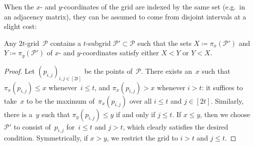 \documentclass[a4paper,UKenglish,cleveref,thm-restate]{lipics-v2021}
\theoremstyle{remark}
\newcommand{\eqdef}{\coloneqq}
\newcommand{\Pc}{\mathcal{P}}
\newcommand{\Xco}{\pi_x}
\newcommand{\Yco}{\pi_y}
\begin{document}
When the $x$- and $y$-coordinates of the grid are indexed by the same set (e.g.\ in an adjacency matrix),
they can be assumed to come from disjoint intervals at a slight cost:
\begin{lemma}\label{lem:grid-disjoint}
    Any $2t$-grid~$\Pc$ contains a $t$-subgrid $\Pc' \subset \Pc$
    such that the sets $X \eqdef \Xco(\Pc')$ and $Y \eqdef \Yco(\Pc')$ of $x$- and $y$-coordinates satisfy either $X < Y$ or $Y < X$.
\end{lemma}
\begin{proof}
    Let $(p_{i,j})_{i,j \in [2t]}$ be the points of~$\Pc$.
    There exists an~$x$ such that $\Xco(p_{i,j}) \le x$ whenever~$i \le t$, and $\Xco(p_{i,j}) > x$ whenever $i > t$:
    it suffices to take~$x$ to be the maximum of~$\Xco(p_{i,j})$ over all $i \le t$ and $j \in [2t]$.
    Similarly, there is a~$y$ such that $\Yco(p_{i,j}) \le y$ if and only if $j \le t$.
    If $x \le y$, then we choose~$\Pc'$ to consist of~$p_{i,j}$ for~$i \le t$ and $j > t$,
    which clearly satisfies the desired condition.
    Symmetrically, if $x > y$, we restrict the grid to $i > t$ and $j \le t$.
\end{proof}
\end{document}
